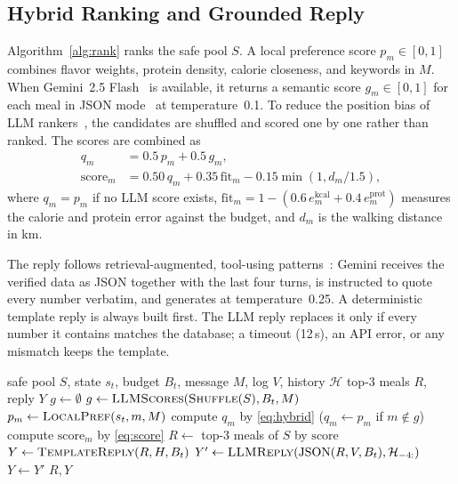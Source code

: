\subsection{Hybrid Ranking and Grounded Reply}
Algorithm~\ref{alg:rank} ranks the safe pool $S$. A local preference score
$p_m \in [0,1]$ combines flavor weights, protein density, calorie closeness,
and keywords in $M$. When Gemini~2.5 Flash~\cite{gemini2025report} is
available, it returns a semantic score $g_m \in [0,1]$ for each meal in JSON
mode~\cite{google2026structured} at temperature~0.1. To reduce the position
bias of LLM rankers~\cite{hou2024llmrank}, the candidates are shuffled and
scored one by one rather than ranked. The scores are combined as
\begin{align}
    q_m &= 0.5\,p_m + 0.5\,g_m, \label{eq:hybrid}\\
    \mathrm{score}_m &= 0.50\,q_m + 0.35\,\mathrm{fit}_m
        - 0.15\min\!\left(1, d_m / 1.5\right), \label{eq:score}
\end{align}
where $q_m = p_m$ if no LLM score exists,
$\mathrm{fit}_m = 1 - (0.6\,e^{\mathrm{kcal}}_m + 0.4\,e^{\mathrm{prot}}_m)$
measures the calorie and protein error against the budget, and $d_m$ is the
walking distance in km.

The reply follows retrieval-augmented, tool-using
patterns~\cite{lewis2020rag,yao2023react}: Gemini receives the verified data
as JSON together with the last four turns, is instructed to quote every number
verbatim, and generates at temperature~0.25. A deterministic template reply is
always built first. The LLM reply replaces it only if every number it contains
matches the database; a timeout (12\,s), an API error, or any mismatch keeps
the template.

\begin{algorithm}[t]
    \caption{Hybrid LLM Ranking and Grounded Reply}
    \label{alg:rank}
    \begin{algorithmic}[1]
        \Require safe pool $S$, state $s_t$, budget $B_t$, message $M$,
            log $V$, history $\mathcal{H}$
        \Ensure top-3 meals $R$, reply $Y$
        \State $g \gets \emptyset$
            \State $g \gets \textsc{LLMScores}(\textsc{Shuffle}(S), B_t, M)$
        \EndIf
            \State $p_m \gets \textsc{LocalPref}(s_t, m, M)$
            \State compute $q_m$ by \eqref{eq:hybrid} ($q_m \gets p_m$ if $m \notin g$)
            \State compute $\mathrm{score}_m$ by \eqref{eq:score}
        \EndFor
        \State $R \gets$ top-3 meals of $S$ by $\mathrm{score}$
        \State $Y \gets \textsc{TemplateReply}(R, H, B_t)$
            \State $Y' \gets \textsc{LLMReply}(\mathrm{JSON}(R, V, B_t), \mathcal{H}_{-4:})$
                \State $Y \gets Y'$
            \EndIf
        \EndIf
        \State \Return $R, Y$
    \end{algorithmic}
\end{algorithm}

